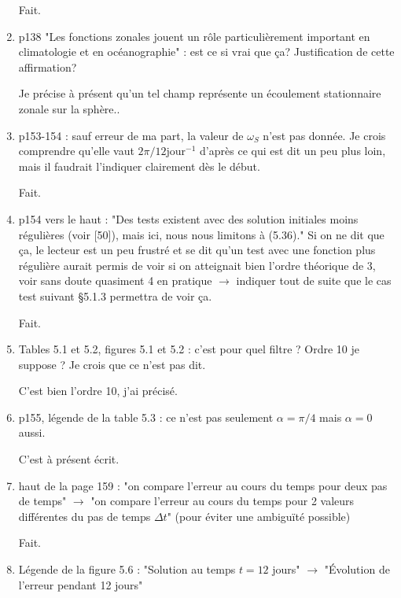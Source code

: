 \documentclass[10pt,a4paper]{article}
\begin{document}
\begin{enumerate}
{\color{blue} Fait.} 


\item p138 "Les fonctions zonales jouent un rôle particulièrement important en climatologie et en océanographie" : est ce si vrai que ça? Justification de cette affirmation?

{\color{blue} Je précise à présent qu'un tel champ représente un écoulement stationnaire zonale sur la sphère..} 


\item p153-154 : sauf erreur de ma part, la valeur de $\omega_S$ n'est pas donnée. Je crois comprendre qu'elle vaut $2\pi/12 \text{jour}^{-1}$ d'après ce qui est dit un peu plus loin, mais il faudrait l'indiquer clairement dès le début.

{\color{blue} Fait.} 


\item p154 vers le haut : "Des tests existent avec des solution initiales moins régulières (voir [50]), mais ici, nous nous limitons à (5.36)." Si on ne dit que ça, le lecteur est un peu frustré et se dit qu'un test avec une fonction plus régulière aurait permis de voir si on atteignait bien l'ordre théorique de 3, voir sans doute quasiment 4 en pratique $\rightarrow$ indiquer tout de suite que le cas test suivant §5.1.3 permettra de voir ça.

{\color{blue} Fait.} 


\item Tables 5.1 et 5.2, figures 5.1 et 5.2 : c’est pour quel filtre ? Ordre 10 je suppose ? Je
crois que ce n’est pas dit.

{\color{blue} C'est bien l'ordre 10, j'ai précisé.} 


\item p155, légende de la table 5.3 : ce n'est pas seulement $\alpha = \pi/4$ mais $\alpha=0$ aussi. 

{\color{blue} C'est à présent écrit.} 


\item haut de la page 159 :  "on compare l'erreur au cours du temps pour deux pas de temps" $\rightarrow$ "on compare l'erreur au cours du temps pour 2 valeurs différentes du pas de temps $\Delta t$" (pour éviter une ambiguïté possible) 

{\color{blue} Fait.} 



\item Légende de la figure 5.6 : "Solution au temps $t=12$ jours" $\rightarrow$ "Évolution de l'erreur pendant 12 jours"


\end{enumerate}
\end{document}
